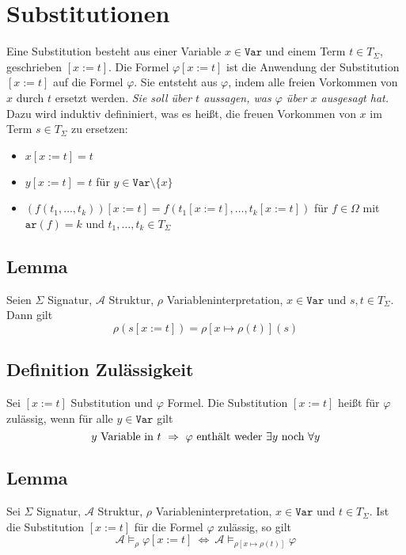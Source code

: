 \documentclass[12pt,a4paper]{report}
\newcommand{\RA}{\Rightarrow}
\newcommand{\ls}{\newline\newline}
\newcommand{\red}[1]{\textcolor[rgb]{0.9,0.2,0.2}{#1}}
\newcommand{\green}[1]{\textcolor[rgb]{0.1,0.6,0.1}{#1}}
\newcommand{\blue}[1]{\textcolor[rgb]{0.2,0.2,1}{#1}}
\begin{document}
\section{\blue{Substitutionen}}
Eine \red{Substitution} besteht aus einer Variable $ x \in \texttt{Var} $ und einem Term $ t \in T_\Sigma $, geschrieben \red{$ [x := t] $}.\ls
Die Formel $ \varphi[x:=t]  $ ist die Anwendung der Substitution $ [x:=t] $ auf die Formel $ \varphi $. Sie entsteht aus $ \varphi $, indem alle freien Vorkommen von $ x $ durch $ t $ ersetzt werden. \textit{Sie soll über $ t $ aussagen, was $ \varphi $ über $ x $ ausgesagt hat.}\ls
Dazu wird induktiv defininiert, was es heißt, die freuen Vorkommen von $ x $ im Term $ s \in T_\Sigma $ zu ersetzen:
\begin{itemize}
    \item $ x[x:=t] = t $
    \item $ y[x:=t] = t $ für $ y \in \texttt{Var}\setminus\{x\} $
    \item $ (f(t_1,\dots,t_k))[x:=t] = f(t_1[x:=t],\dots,t_k[x:=t]) $ für $ f \in \Omega $ mit $ \texttt{ar}(f) = k $ und $ t_1,\dots,t_k \in T_\Sigma $
\end{itemize}
\subsection{\green{Lemma}}
Seien $ \Sigma $ Signatur, $ \mathcal{A} $ Struktur, $ \rho $ Variableninterpretation, $ x \in \texttt{Var} $ und $ s,t \in T_\Sigma $. Dann gilt
\[
    \rho(s[x:=t]) = \rho[x \mapsto \rho(t)](s)
\]
\subsection{\blue{Definition Zulässigkeit}}
Sei $ [x:=t] $ Substitution und $ \varphi $ Formel.\newline
Die Substitution $ [x:=t] $ heißt \red{für $ \varphi $ zulässig}, wenn für alle $ y \in \texttt{Var} $ gilt
\[
    y \textnormal{ Variable in }t ~\RA~ \varphi \textnormal{ enthält weder } \exists y \textnormal{ noch } \forall y
\]
\subsection{\green{Lemma}}
Sei $ \Sigma $ Signatur, $ \mathcal{A} $ Struktur, $ \rho $ Variableninterpretation, $ x \in \texttt{Var} $ und $ t \in T_\Sigma $. Ist die Substitution $ [x:=t] $ für die Formel $ \varphi $ zulässig, so gilt
\[
    \mathcal{A} \vDash_\rho \varphi[x:=t] ~\Leftrightarrow~ \mathcal{A} \vDash_{\rho[x \mapsto \rho(t)]} \varphi
\]
\end{document}
